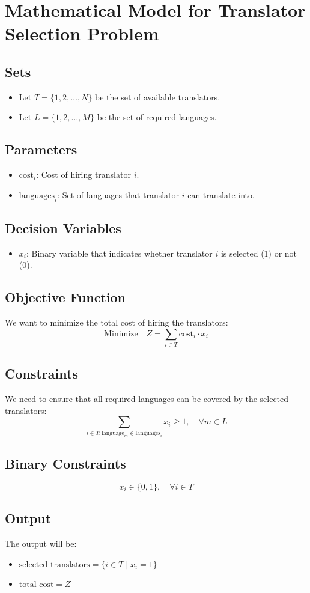 \documentclass{article}
\begin{document}
\section*{Mathematical Model for Translator Selection Problem}

\subsection*{Sets}
\begin{itemize}
    \item Let \( T = \{1, 2, \ldots, N\} \) be the set of available translators.
    \item Let \( L = \{1, 2, \ldots, M\} \) be the set of required languages.
\end{itemize}

\subsection*{Parameters}
\begin{itemize}
    \item \( \text{cost}_i \): Cost of hiring translator \( i \).
    \item \( \text{languages}_i \): Set of languages that translator \( i \) can translate into.
\end{itemize}

\subsection*{Decision Variables}
\begin{itemize}
    \item \( x_i \): Binary variable that indicates whether translator \( i \) is selected (1) or not (0).
\end{itemize}

\subsection*{Objective Function}
We want to minimize the total cost of hiring the translators:
\[
\text{Minimize} \quad Z = \sum_{i \in T} \text{cost}_i \cdot x_i
\]

\subsection*{Constraints}
We need to ensure that all required languages can be covered by the selected translators:
\[
\sum_{i \in T : \text{language}_m \in \text{languages}_i} x_i \geq 1, \quad \forall m \in L
\]

\subsection*{Binary Constraints}
\[
x_i \in \{0, 1\}, \quad \forall i \in T
\]

\subsection*{Output}
The output will be:
\begin{itemize}
    \item \( \text{selected\_translators} = \{ i \in T \mid x_i = 1 \} \)
    \item \( \text{total\_cost} = Z \)
\end{itemize}
\end{document}

